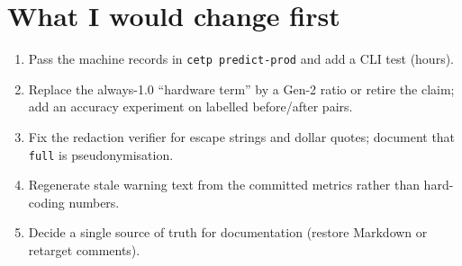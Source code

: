 \section{What I would change first}
\begin{enumerate}
\item Pass the machine records in \texttt{cetp predict-prod} and add a CLI test (hours).
\item Replace the always-1.0 ``hardware term'' by a Gen-2 ratio or retire the claim; add an accuracy experiment on labelled before/after pairs.
\item Fix the redaction verifier for escape strings and dollar quotes; document that \texttt{full} is pseudonymisation.
\item Regenerate stale warning text from the committed metrics rather than hard-coding numbers.
\item Decide a single source of truth for documentation (restore Markdown or retarget comments).
\end{enumerate}
